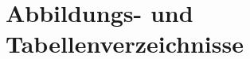 \appendix

\chapter{Abbildungs- und Tabellenverzeichnisse}
\listoffigures
\listoftables



\printglossary[style=altlist, numberedsection]


